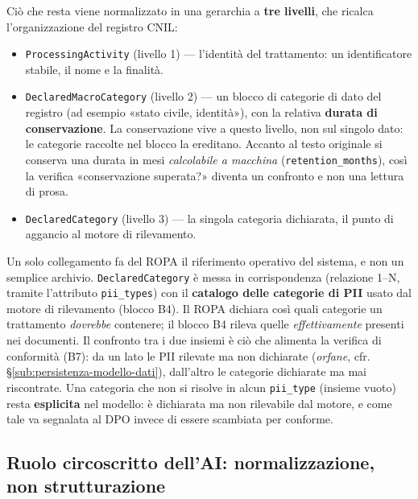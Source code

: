 Ciò che resta viene normalizzato in una gerarchia a \textbf{tre livelli}, che ricalca l'organizzazione del registro CNIL:
\begin{itemize}
	\item \texttt{ProcessingActivity} (livello 1) --- l'identità del trattamento: un identificatore stabile, il nome e la finalità.
	\item \texttt{DeclaredMacroCategory} (livello 2) --- un blocco di categorie di dato del registro (ad esempio «stato civile, identità»), con la relativa \textbf{durata di conservazione}. La conservazione vive a questo livello, non sul singolo dato: le categorie raccolte nel blocco la ereditano. Accanto al testo originale si conserva una durata in mesi \textit{calcolabile a macchina} (\texttt{retention\_months}), così la verifica «conservazione superata?» diventa un confronto e non una lettura di prosa.
	\item \texttt{DeclaredCategory} (livello 3) --- la singola categoria dichiarata, il punto di aggancio al motore di rilevamento.
\end{itemize}

Un solo collegamento fa del ROPA il riferimento operativo del sistema, e non un semplice archivio. \texttt{DeclaredCategory} è messa in corrispondenza (relazione 1--N, tramite l'attributo \texttt{pii\_types}) con il \textbf{catalogo delle categorie di PII} usato dal motore di rilevamento (blocco B4). Il ROPA dichiara così quali categorie un trattamento \textit{dovrebbe} contenere; il blocco B4 rileva quelle \textit{effettivamente} presenti nei documenti. Il confronto tra i due insiemi è ciò che alimenta la verifica di conformità (B7): da un lato le PII rilevate ma non dichiarate (\textit{orfane}, cfr. §\ref{sub:persistenza-modello-dati}), dall'altro le categorie dichiarate ma mai riscontrate. Una categoria che non si risolve in alcun \texttt{pii\_type} (insieme vuoto) resta \textbf{esplicita} nel modello: è dichiarata ma non rilevabile dal motore, e come tale va segnalata al DPO invece di essere scambiata per conforme.

\subsection{Ruolo circoscritto dell'AI: normalizzazione, non strutturazione}
\label{sub:ropa-ai}

